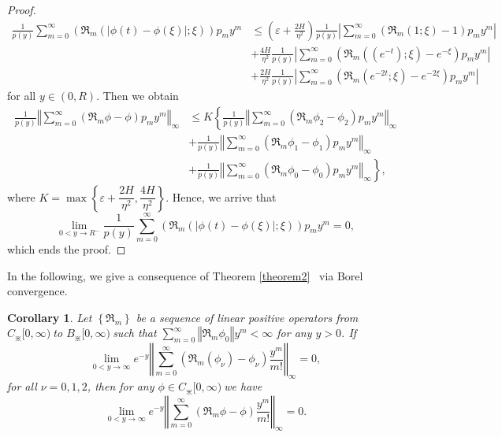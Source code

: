 \documentclass{amsart}
\theoremstyle{plain}
\newtheorem{corollary}{Corollary}
\numberwithin{equation}{section}
\begin{document}
\begin{proof}
\begin{align*}
\frac{1}{p(y)}\sum \limits_{m=0}^{\infty}\left(  \Re_{m}\left(  \left \vert
\phi \left(  t\right)  -\phi \left(  \xi \right)  \right \vert ;\xi \right)
\right)  p_{m}y^{m} &  \leq \left(  \varepsilon+\frac{2H}{\eta^{2}}\right)
\frac{1}{p(y)}\left \vert \sum \limits_{m=0}^{\infty}\left(  \Re_{m}\left(
1;\xi \right)  -1\right)  p_{m}y^{m}\right \vert \\
&  +\frac{4H}{\eta^{2}}\frac{1}{p(y)}\left \vert \sum \limits_{m=0}^{\infty
}\left(  \Re_{m}\left(  \left(  e^{-t}\right)  ;\xi \right)  -e^{-\xi}\right)
p_{m}y^{m}\right \vert \\
&  +\frac{2H}{\eta^{2}}\frac{1}{p(y)}\left \vert \sum \limits_{m=0}^{\infty
}\left(  \Re_{m}\left(  e^{-2t};\xi \right)  -e^{-2\xi}\right)  p_{m}%
y^{m}\right \vert 
\end{align*}
for all $y\in \left(  0,R\right)  $. Then we obtain
\begin{align*}
\frac{1}{p(y)}\left \Vert \sum \limits_{m=0}^{\infty}\left(  \Re_{m}\phi
-\phi \right)  p_{m}y^{m}\right \Vert _{\infty} &  \leq K\left \{  \frac{1}%
{p(y)}\left \Vert \sum \limits_{m=0}^{\infty}\left(  \Re_{m}\phi_{2}-\phi
_{2}\right)  p_{m}y^{m}\right \Vert _{\infty}\right.  \\
&  +\frac{1}{p(y)}\left \Vert \sum \limits_{m=0}^{\infty}\left(  \Re_{m}\phi
_{1}-\phi_{1}\right)  p_{m}y^{m}\right \Vert _{\infty}\\
&  +\left.  \frac{1}{p(y)}\left \Vert \sum \limits_{m=0}^{\infty}\left(  \Re
_{m}\phi_{0}-\phi_{0}\right)  p_{m}y^{m}\right \Vert _{\infty}\right \}  ,
\end{align*}
where $K=\max \left \{  \varepsilon+\dfrac{2H}{\eta^{2}},\dfrac{4H}{\eta^{2}%
}\right \}  .$ Hence, we arrive that
\[
\lim_{0<y\rightarrow R^{-}}\frac{1}{p(y)}\sum \limits_{m=0}^{\infty}\left(
\Re_{m}\left(  \left \vert \phi \left(  t\right)  -\phi \left(  \xi \right)
\right \vert ;\xi \right)  \right)  p_{m}y^{m}=0,
\]
which ends the proof.
\end{proof}

In the following, we give a consequence of Theorem \ref{theorem2} \ via Borel convergence.

\begin{corollary}
\label{Borel corollary copy(1)}Let $\left \{  \Re_{m}
\right \} $ be a sequence of linear positive operators from $C_{\divideontimes
}[0,\infty)\ $to $B_{\divideontimes}[0,\infty)\ $such that $%
{\displaystyle \sum \limits_{m=0}^{\infty}}
\left \Vert \Re_{m}\phi_{0}\right \Vert y^{m}<\infty$ for any $y>0$. If%
\begin{equation}
\lim_{0<y\rightarrow \infty}e^{-y}\left \Vert \sum \limits_{m=0}^{\infty}(
\Re_{m}\left(  \phi_{\nu}\right)  -\phi_{\nu})  \frac{y^{m}}%
{m!}\right \Vert _{\infty}=0, \label{6a}%
\end{equation}
for all $\nu=0,1,2$, then for any $\phi \in C_{\divideontimes
}[0,\infty)\ $we have
\[
\lim_{0<y\rightarrow \infty}e^{-y}\left \Vert \sum \limits_{m=0}^{\infty}\left(
\Re_{m}  \phi   -\phi \right)  \frac{y^{m}}{m!}\right \Vert
_{\infty}=0.
\]

\end{corollary}
\end{document}
